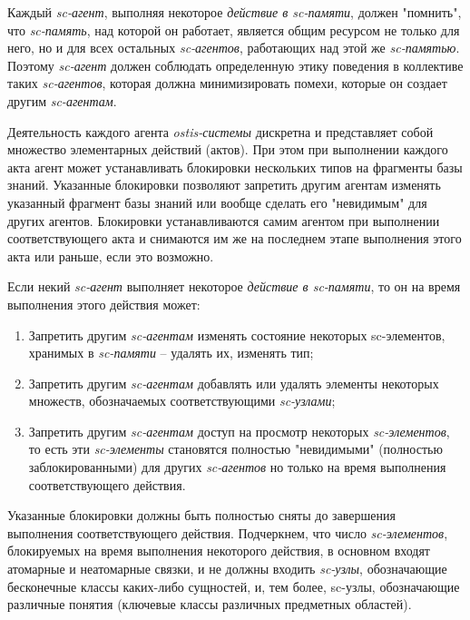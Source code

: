 \begin{textitemize}
	\item Каждый \textit{sc-агент}, выполняя некоторое \textit{действие в sc-памяти}, должен "помнить"{}, что \textit{sc-память}, над которой он работает, является общим ресурсом не только для него, но и для всех остальных \textit{\mbox{sc-агентов}}, работающих над этой же \textit{sc-памятью}. Поэтому \textit{sc-агент} должен соблюдать определенную этику поведения в коллективе таких \textit{sc-агентов}, которая должна минимизировать помехи, которые он создает другим \textit{sc-агентам}.
	
	\item Деятельность каждого агента \textit{ostis-системы} дискретна и представляет собой множество элементарных действий (актов). При этом при выполнении каждого акта агент может устанавливать блокировки нескольких типов на фрагменты базы знаний. Указанные блокировки позволяют запретить другим агентам изменять указанный фрагмент базы знаний или вообще сделать его "невидимым"{} для других агентов. Блокировки устанавливаются самим агентом при выполнении соответствующего акта и снимаются им же на последнем этапе выполнения этого акта или раньше, если это возможно.
	\item Если некий \textit{sc-агент} выполняет некоторое \textit{действие в sc-памяти}, то он на время выполнения этого действия может:
	\begin{enumerate}
		\item Запретить другим \textit{sc-агентам} изменять состояние некоторых sc-элементов, хранимых в \textit{sc-памяти} -- удалять их, изменять тип;
		\item Запретить другим \textit{sc-агентам} добавлять или удалять элементы некоторых множеств, обозначаемых соответствующими \textit{sc-узлами};
		\item Запретить другим \textit{sc-агентам} доступ на просмотр некоторых \textit{sc-элементов}, то есть эти \textit{\mbox{sc-элементы}} становятся полностью "невидимыми"{} (полностью заблокированными) для других \textit{sc-агентов} но только на время выполнения соответствующего действия.
	\end{enumerate}
	
	Указанные блокировки должны быть полностью сняты до завершения выполнения соответствующего действия. Подчеркнем, что число \textit{sc-элементов}, блокируемых на время выполнения некоторого действия, в основном входят атомарные и неатомарные связки, и не должны входить \textit{sc-узлы}, обозначающие бесконечные классы каких-либо сущностей, и, тем более, sc-узлы, обозначающие различные понятия (ключевые классы различных предметных областей).
	

\end{textitemize}
